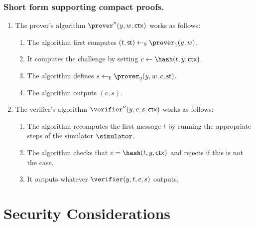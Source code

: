 \documentclass[runningheads]{llncs}
\begin{document}
\subsubsection{Short form supporting compact proofs.}
\begin{enumerate}
  \item
    The prover's algorithm $\prover''(y,w,\ctx)$ works as follows:
    \begin{enumerate}
      \item
        The algorithm first computes $(t,\st)\getsr\prover_1(y,w)$.
      \item
        It computes the challenge by setting $c\gets\hash(t,y,\ctx)$.
      \item
        The algorithm defines $s\getsr\prover_2(y,w,c,\st)$.
      \item
        The algorithm outputs $(c,s)$.
    \end{enumerate}
  \item
    The verifier's algorithm $\verifier''(y,c,s,\ctx)$ works as follows:
    \begin{enumerate}
      \item
        The algorithm recomputes the first message $t$ by running the appropriate steps of the simulator $\simulator$.
      \item
        The algorithm checks that $c=\hash(t,y,\ctx)$ and rejects if this is not the case.
      \item
        It outputs whatever $\verifier(y,t,c,s)$ outputs.
    \end{enumerate}
\end{enumerate}

\section{Security Considerations}
\end{document}
